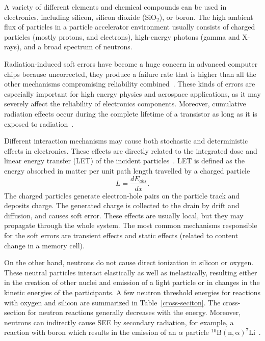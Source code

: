 A variety of different elements and chemical compounds can be used in electronics, including silicon, silicon dioxide ($\mathrm{SiO}_{2}$), or boron. The high ambient flux of particles in a particle accelerator environment usually consists of charged particles (mostly protons, and electrons), high-energy photons (gamma and X-rays), and a broad spectrum of neutrons.

 Radiation-induced soft errors have become a huge concern in advanced computer chips because uncorrected, they produce a failure rate that is higher than all the other mechanisms compromising reliability combined~\cite{1545891}. These kinds of errors are especially important for high energy physics and aerospace applications, as it may severely affect the reliability of electronics components. Moreover, cumulative radiation effects occur during the complete lifetime of a transistor as long as it is exposed to radiation~\cite{RodriguezRodriguez2020}.

Different interaction mechanisms may cause both stochastic and deterministic effects in electronics. These effects are directly related to the integrated dose and linear energy transfer (\gls{LET}) of the incident particles~\cite{electronic_system_on_module}.  LET is defined as the energy absorbed in matter per unit path length travelled by a charged particle
\begin{equation}
    L = \frac{dE_{abs}}{dx}.
\end{equation}
The charged particles generate electron-hole pairs on the particle track and deposits charge. The generated charge is collected to the drain by drift and diffusion, and causes soft error. These effects are usually local, but they may propagate through the whole system. The most common mechanisms responsible for the soft errors are transient effects and static effects (related to content change in a memory cell). 

On the other hand, neutrons do not cause direct ionization in silicon or oxygen. These neutral particles interact elastically as well as inelastically, resulting either in the creation of other nuclei and emission of a light particle or in changes in the kinetic energies of the participants. A few neutron threshold energies for reactions with oxygen and silicon are summarized in Table~\ref{cross-seciton}. The cross-section for neutron reactions generally decreases with the energy. Moreover, neutrons can indirectly cause \gls{SEE} by secondary radiation, for example, a reaction with boron which results in the emission of an $\alpha$ particle $\mathrm{^{10}B(n,\alpha)^{7}Li}$~\cite{1545891,neutrons_energy,neutrons_energy_2}. 

